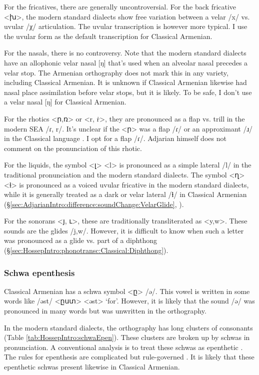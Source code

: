 For the fricatives, there are generally uncontroversial. 		 For the back fricative <խ>, the modern standard dialects show free variation between a velar /x/ vs. uvular /χ/ articulation. The uvular transcription is however more typical. I use the uvular form as the default transcription for Classical Armenian. 

For the nasals, there is no controversy. Note that the modern standard dialects have an allophonic velar nasal [ŋ] that's used when an alveolar nasal precedes a velar stop. The Armenian orthography does not mark this in any variety, including Classical Armenian. It is unknown if Classical Armenian likewise had nasal place assimilation before velar stops, but it is likely. To be safe, I don't use a velar nasal [ŋ] for Classical Armenian. 

For the rhotics <ր,ռ> or <r, ṙ>, they are pronounced as a flap vs. trill in the modern SEA /ɾ, r/. It's unclear if the <ր> was a flap /ɾ/ or an approximant /ɹ/ in the Classical language \citep[1040]{Macak-2017-PhonoClassicalArmenian}. I opt for a flap /ɾ/. Adjarian himself does not comment on the pronunciation of this rhotic. 


For the liquids, the symbol <լ> <l> is pronounced as a simple lateral /l/ in the traditional pronunciation and the modern standard dialects. The symbol <ղ> <ɬ> is pronounced as a voiced uvular fricative in the modern standard dialects, while it is generally treated as a dark or velar lateral /ɬ/ in Classical Armenian (\S\ref{sec:AdjarianIntro:difference:soundChange:VelarGlide}, \citealt[ch2]{Macak-2016-StudiesClassicalModernArmenianPhono}).

For the sonorans <յ, ւ>, these are traditionally transliterated as <y,w>. These sounds are the glides /j,w/. However, it is difficult to know when such a letter was pronounced as a glide vs. part of a diphthong (\S\ref{sec:HossepIntro:phonotransc:Classical:Diphthong}). 

\subsubsection{Schwa epenthesis}\label{sec:HossepIntro:phonotransc:CA:schwa}


Classical Armenian has a schwa symbol <ը> /ə/. This vowel is written in some words like /əst/ <ըստ> <əst> `for'. However, it is likely that the sound /ə/ was pronounced in many words but was unwritten in the orthography. 

In the modern standard dialects, the orthography has long clusters of consonants (Table \ref{tab:HossepIntro:schwaEpen}). These clusters are broken up by schwas in pronunciation. A conventional analysis is to treat these schwas as epenthetic \citep{Vaux-1998-ArmenianPhono}. The rules for epenthesis are complicated but rule-governed \citep[cf.]{Dolatian-prep-Schwa}. It is likely that these epenthetic schwas present likewise in Classical Armenian. 




